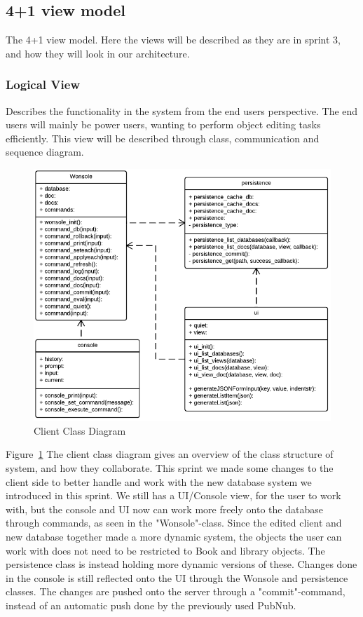 \subsection{4+1 view model}
The 4+1 view model\cite{Kruchten}. Here the views will be described as they are in sprint 3, and how they will look in our architecture. 

\subsubsection{Logical View}
Describes the functionality in the system from the end users perspective. The end users will mainly be power users, wanting to perform object editing tasks efficiently. This view will be described through class, communication and sequence diagram.

\begin{figure}[h]
\centering
\includegraphics[width=6in]{image/architecture/s3/s3clientClassDiagram.png}
\caption{Client Class Diagram}
\label{figure:s3clientClassDiagram}
\end{figure}

Figure~\ref{figure:s3clientClassDiagram} The client class diagram gives an overview of the class structure of system, and how they collaborate. This sprint we made some changes to the client side to better handle and work with the new database system we introduced in this sprint. We still has a UI/Console view, for the user to work with, but the console and UI now can work more freely onto the database through commands, as seen in the "Wonsole"-class. Since the edited client and new database together made a more dynamic system, the objects the user can work with does not need to be restricted to Book and library objects. The persistence class is instead holding more dynamic versions of these. Changes done in the console is still reflected onto the UI through the Wonsole and persistence classes. The changes are pushed onto the server through a "commit"-command, instead of an automatic push done by the previously used PubNub.

